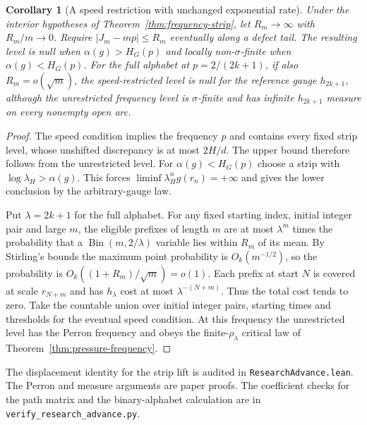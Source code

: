 \documentclass[11pt]{article}
\newtheorem{corollary}[theorem]{Corollary}
\theoremstyle{definition}
\theoremstyle{remark}
\begin{document}
\begin{corollary}[A speed restriction with unchanged exponential rate]
\label{cor:sublinear-speed}
Under the interior hypotheses of Theorem~\ref{thm:frequency-strip},
let $R_m\to\infty$ with $R_m/m\to0$. Require
$|J_m-mp|\le R_m$ eventually along a defect tail.
The resulting level is null when $\alpha(g)>H_G(p)$ and locally
non-$\sigma$-finite when $\alpha(g)<H_G(p)$.
For the full alphabet at $p=2/(2k+1)$, if also $R_m=o(\sqrt m)$,
the speed-restricted level is null for the reference gauge
$h_{2k+1}$, although the unrestricted frequency level is $\sigma$-finite
and has infinite $h_{2k+1}$ measure on every nonempty open arc.
\end{corollary}
\begin{proof}
The speed condition implies the frequency $p$ and contains
every fixed strip level, whose unshifted discrepancy is at most
$2H/d$. The upper bound therefore follows from the unrestricted
level. For $\alpha(g)<H_G(p)$ choose a strip with
$\log\lambda_H>\alpha(g)$. This forces
$\liminf\lambda_H^n g(r_n)=+\infty$ and gives the lower conclusion
by the arbitrary-gauge law.

Put $\lambda=2k+1$ for the full alphabet.
For any fixed starting index, initial integer pair and large $m$,
the eligible prefixes of length $m$ are at most $\lambda^m$ times
the probability that a $\operatorname{Bin}(m,2/\lambda)$ variable
lies within $R_m$ of its mean. By Stirling's bounds the maximum
point probability is $O_k(m^{-1/2})$, so the probability is
$O_k((1+R_m)/\sqrt m)=o(1)$.
Each prefix at start $N$ is covered at scale $r_{N+m}$ and has
$h_\lambda$ cost at most $\lambda^{-(N+m)}$.
Thus the total cost tends to zero. Take the countable union over
initial integer pairs, starting times and thresholds for the
eventual speed condition. At this frequency the unrestricted level
has the Perron frequency and obeys the finite-$\rho_\lambda$ critical
law of Theorem~\ref{thm:pressure-frequency}.
\end{proof}
The displacement identity for the strip lift is audited
in \texttt{ResearchAdvance.lean}. The Perron and measure arguments
are paper proofs. The coefficient checks for the path matrix and
the binary-alphabet calculation are in
\texttt{verify\_research\_advance.py}.
\end{document}
